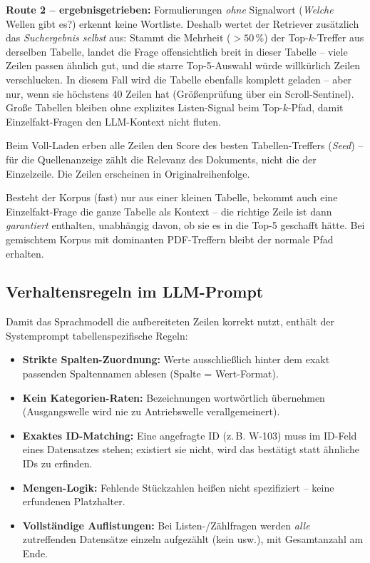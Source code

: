 \documentclass[12pt, a4paper]{article}
\begin{document}
\textbf{Route 2 -- ergebnisgetrieben:} Formulierungen \emph{ohne} Signalwort
(\glqq \emph{Welche} Wellen gibt es?\grqq) erkennt keine Wortliste. Deshalb
wertet der Retriever zusätzlich das \emph{Suchergebnis selbst} aus: Stammt die
Mehrheit ($>50\,\%$) der Top-$k$-Treffer aus derselben Tabelle, \glqq landet\grqq{}
die Frage offensichtlich breit in dieser Tabelle -- viele Zeilen passen ähnlich
gut, und die starre Top-5-Auswahl würde willkürlich Zeilen verschlucken. In
diesem Fall wird die Tabelle ebenfalls komplett geladen -- aber nur, wenn sie
höchstens 40 Zeilen hat (Größenprüfung über ein Scroll-Sentinel). Große
Tabellen bleiben ohne explizites Listen-Signal beim Top-$k$-Pfad, damit
Einzelfakt-Fragen den LLM-Kontext nicht fluten.

Beim Voll-Laden erben alle Zeilen den Score des besten Tabellen-Treffers
(\emph{Seed}) -- für die Quellenanzeige zählt die Relevanz des Dokuments, nicht
die der Einzelzeile. Die Zeilen erscheinen in Originalreihenfolge.

\begin{hinweisbox}
Besteht der Korpus (fast) nur aus einer kleinen Tabelle, bekommt auch eine
Einzelfakt-Frage die ganze Tabelle als Kontext -- die richtige Zeile ist dann
\emph{garantiert} enthalten, unabhängig davon, ob sie es in die Top-5 geschafft
hätte. Bei gemischtem Korpus mit dominanten PDF-Treffern bleibt der normale
Pfad erhalten.
\end{hinweisbox}

\subsection{Verhaltensregeln im LLM-Prompt}

Damit das Sprachmodell die aufbereiteten Zeilen korrekt nutzt, enthält der
Systemprompt tabellenspezifische Regeln:

\begin{itemize}[itemsep=2pt]
  \item \textbf{Strikte Spalten-Zuordnung:} Werte ausschließlich hinter dem
        exakt passenden Spaltennamen ablesen (\glqq Spalte = Wert\grqq-Format).
  \item \textbf{Kein Kategorien-Raten:} Bezeichnungen wortwörtlich übernehmen
        (\glqq Ausgangswelle\grqq{} wird nie zu \glqq Antriebswelle\grqq{}
        verallgemeinert).
  \item \textbf{Exaktes ID-Matching:} Eine angefragte ID (z.\,B. W-103) muss
        im ID-Feld eines Datensatzes stehen; existiert sie nicht, wird das
        bestätigt statt ähnliche IDs zu erfinden.
  \item \textbf{Mengen-Logik:} Fehlende Stückzahlen heißen
        \glqq nicht spezifiziert\grqq{} -- keine erfundenen Platzhalter.
  \item \textbf{Vollständige Auflistungen:} Bei Listen-/Zählfragen werden
        \emph{alle} zutreffenden Datensätze einzeln aufgezählt (kein
        \glqq usw.\grqq), mit Gesamtanzahl am Ende.
\end{itemize}
\end{document}
